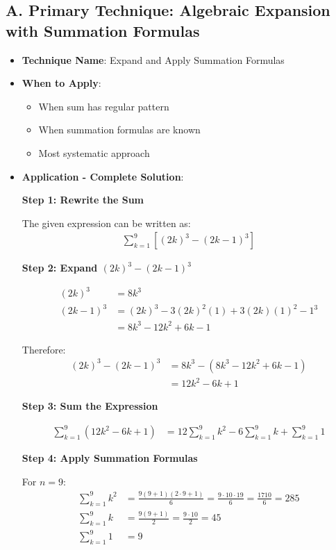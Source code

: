 \documentclass[12pt]{article}
\begin{document}
\begin{techniquesbox}
\subsection*{A. Primary Technique: Algebraic Expansion with Summation Formulas}
\begin{itemize}[leftmargin=*]
    \item \textbf{Technique Name}: Expand and Apply Summation Formulas
    \item \textbf{When to Apply}: 
    \begin{itemize}
        \item When sum has regular pattern
        \item When summation formulas are known
        \item Most systematic approach
    \end{itemize}
    \item \textbf{Application - Complete Solution}: 
    
    \textbf{Step 1: Rewrite the Sum}
    
    The given expression can be written as:
    \begin{align*}
    \sum_{k=1}^{9} [(2k)^3 - (2k-1)^3]
    \end{align*}
    
    \textbf{Step 2: Expand $(2k)^3 - (2k-1)^3$}
    
    \begin{align*}
    (2k)^3 &= 8k^3\\
    (2k-1)^3 &= (2k)^3 - 3(2k)^2(1) + 3(2k)(1)^2 - 1^3\\
    &= 8k^3 - 12k^2 + 6k - 1
    \end{align*}
    
    Therefore:
    \begin{align*}
    (2k)^3 - (2k-1)^3 &= 8k^3 - (8k^3 - 12k^2 + 6k - 1)\\
    &= 12k^2 - 6k + 1
    \end{align*}
    
    \textbf{Step 3: Sum the Expression}
    
    \begin{align*}
    \sum_{k=1}^{9} (12k^2 - 6k + 1) &= 12\sum_{k=1}^{9} k^2 - 6\sum_{k=1}^{9} k + \sum_{k=1}^{9} 1
    \end{align*}
    
    \textbf{Step 4: Apply Summation Formulas}
    
    For $n = 9$:
    \begin{align*}
    \sum_{k=1}^{9} k^2 &= \frac{9(9+1)(2 \cdot 9+1)}{6} = \frac{9 \cdot 10 \cdot 19}{6} = \frac{1710}{6} = 285\\
    \sum_{k=1}^{9} k &= \frac{9(9+1)}{2} = \frac{9 \cdot 10}{2} = 45\\
    \sum_{k=1}^{9} 1 &= 9
    \end{align*}
    

\end{itemize}
\end{techniquesbox}
\end{document}
